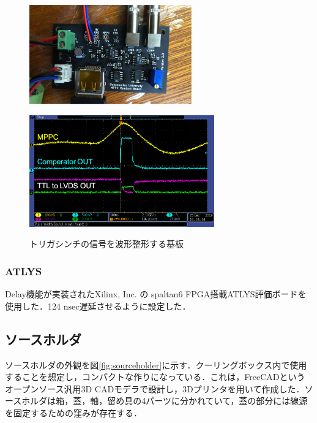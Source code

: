 \begin{figure}[h]
  \centering
  \begin{minipage}[b]{0.45\linewidth}
    \centering
    \includegraphics[width=7cm]{./figure/pcb.png}
    \label{fig:pcb}
  \end{minipage}
  \begin{minipage}[b]{0.45\linewidth}
    \centering
    \includegraphics[width=8cm]{./figure/pcbosiro.png}
    \label{fig:extosiro}
  \end{minipage}
  \caption{トリガシンチの信号を波形整形する基板}
\end{figure}

\subsubsection*{ATLYS}
Delay機能が実装されたXilinx, Inc. の spaltan6 FPGA搭載ATLYS評価ボードを使用した．124 $\mathrm{nsec}$遅延させるように設定した．

\subsection{ソースホルダ}
ソースホルダの外観を図\ref{fig:sourceholder}に示す．クーリングボックス内で使用することを想定し，コンパクトな作りになっている．これは，FreeCADというオープンソース汎用3D CADモデラで設計し，3Dプリンタを用いて作成した．ソースホルダは箱，蓋，軸，留め具の4パーツに分かれていて，蓋の部分には線源を固定するための窪みが存在する．

